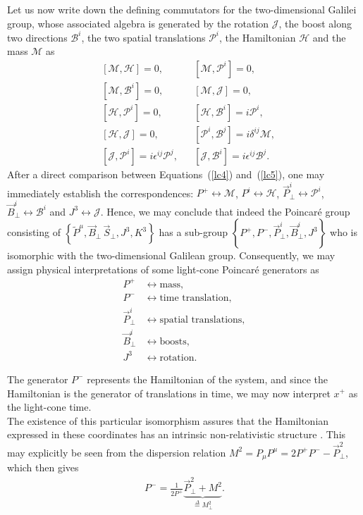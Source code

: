 Let us now write down the defining commutators for the two-dimensional Galilei group, whose associated algebra is generated by the rotation $\mathcal{J}$, the boost along two directions $\mathcal{B}^i$, the two spatial translations $\mathcal{P}^i$, the Hamiltonian $\mathcal{H}$ and the mass $\mathcal{M}$ as
\begin{equation}
\label{lc5}
\begin{aligned}
&[\mathcal{M},\mathcal{H}]=0, && [\mathcal{M},\mathcal{P}^i]=0, \\
&[\mathcal{M},\mathcal{B}^i]=0, && [\mathcal{M},\mathcal{J}]=0, \\
&[\mathcal{H},\mathcal{P}^i]=0, && [\mathcal{H},\mathcal{B}^i]=i\mathcal{P}^i,\\
&[\mathcal{H},\mathcal{J}]=0, && [\mathcal{P}^i,\mathcal{B}^j]=i\delta^{ij}\mathcal{M},\\
&[\mathcal{J},\mathcal{P}^i]=i\epsilon^{ij}\mathcal{P}^j, &&[\mathcal{J},\mathcal{B}^i]=i\epsilon^{ij}\mathcal{B}^j.
\end{aligned}
\end{equation}
After a direct comparison between Equations~(\cref{lc4}) and~(\cref{lc5}), one may immediately establish the correspondences: $P^+\leftrightarrow \mathcal{M}$, $P^i\leftrightarrow \mathcal{H}$, $\vec{P}_\perp^i\leftrightarrow \mathcal{P}^i$, $\vec{B}_\perp^i\leftrightarrow \mathcal{B}^i$ and $J^3\leftrightarrow \mathcal{J}$. Hence, we may conclude that indeed the Poincar\'e group consisting of $\left\lbrace \tilde{P}^\mu,\vec{B}_\perp\,\vec{S}_\perp,J^3, K^3\right\rbrace$ has a sub-group $\left\lbrace P^+,P^-,\vec{P}_\perp^i,\vec{B}_\perp^i,J^3 \right\rbrace$ who is isomorphic with the two-dimensional Galilean group. Consequently, we may assign physical interpretations of some light-cone Poincar\'e generators as
\begin{align*}
P^+&\longleftrightarrow\text{mass},\\
P^-&\longleftrightarrow\text{time translation},\\
\vec{P}_\perp^i&\longleftrightarrow\text{spatial translations},\\
\vec{B}_\perp^i&\longleftrightarrow\text{boosts},\\
J^3&\longleftrightarrow\text{rotation}.
\end{align*}

The generator $P^-$ represents the Hamiltonian of the system, and since the Hamiltonian is the generator of translations in time, we may now interpret $x^+$ as the light-cone time. \\ 
The existence of this particular isomorphism assures that the Hamiltonian expressed in these coordinates has an intrinsic non-relativistic structure \cite{susskind}. This may explicitly be seen from the dispersion relation $M^2=P_\mu P^\mu=2P^+P^--\vec{P}_\perp^2$, which then gives
\begin{align}\label{lc37}
P^-=\frac{1}{2P^+}\underbrace{\vec{P}_\perp^2+M^2}_{\overset{\Delta}{=}M^2_\perp}.
\end{align}

